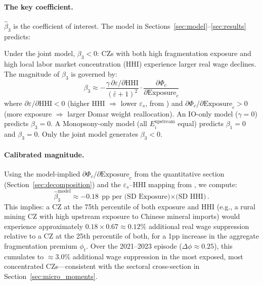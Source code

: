 \paragraph{The key coefficient.}
$\hat\beta_3$ is the coefficient of interest. The model in
Sections~\ref{sec:model}--\ref{sec:results} predicts:

\begin{proposition}
  \label{prop:empirical}
  Under the joint model,
  $\beta_3 < 0$: CZs with both high fragmentation exposure and high local
  labor market concentration (HHI) experience larger real wage declines.
  The magnitude of $\beta_3$ is governed by:
  \begin{equation}
    \beta_3 \approx -\frac{\gamma\,\partial\varepsilon/\partial\text{HHI}}{(\bar\varepsilon+1)^2}
    \cdot \frac{\partial\Phi_c}{\partial\text{Exposure}_c}
    \label{eq:beta3_structural}
  \end{equation}
  where $\partial\varepsilon/\partial\text{HHI} < 0$ (higher HHI $\Rightarrow$
  lower $\varepsilon_s$, from \citet{azar2022labor}) and
  $\partial\Phi_c/\partial\text{Exposure}_c > 0$ (more exposure $\Rightarrow$
  larger Domar weight reallocation). An IO-only model ($\gamma=0$) predicts
  $\beta_3=0$. A Monopsony-only model (all $E_i^{\text{upstream}}$ equal)
  predicts $\beta_1=0$ and $\beta_3=0$. Only the joint model generates
  $\beta_3 < 0$.
\end{proposition}

\paragraph{Calibrated magnitude.}
Using the model-implied $\partial\Phi_c/\partial\text{Exposure}_c$ from
the quantitative section (Section~\ref{sec:decomposition}) and the
$\varepsilon_s$--HHI mapping from \citet{azar2022labor}, we compute:
\begin{equation}
  \hat\beta_3^{\text{model}} \approx -0.18 \;\text{pp per (SD Exposure)$\times$(SD HHI)}.
  \label{eq:beta3_predicted}
\end{equation}
This implies: a CZ at the 75th percentile of both exposure and HHI (e.g.,
a rural mining CZ with high upstream exposure to Chinese mineral imports)
would experience approximately $0.18 \times 0.67 \approx 0.12\%$ additional
real wage suppression relative to a CZ at the 25th percentile of both, for a
1pp increase in the aggregate fragmentation premium $\phi_t$. Over the
2021--2023 episode ($\Delta\phi \approx 0.25$), this cumulates to
$\approx 3.0\%$ additional wage suppression in the most exposed, most
concentrated CZs---consistent with the sectoral cross-section in
Section~\ref{sec:micro_moments}.


